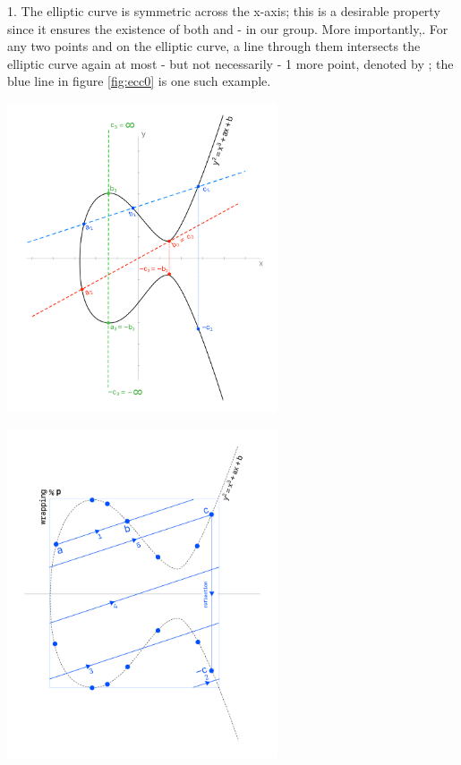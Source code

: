 \documentclass[a4paper,10pt]{article}
\begin{document}
\begin{flushleft}
{{	1. The elliptic curve is symmetric across the x-axis; this is a desirable property since it ensures the existence of both {} and -{} in our group. More importantly,. For any two points {} and {} on the elliptic curve, a line through them intersects the elliptic curve again at most - but not necessarily - 1 more point, denoted by {}; the blue line in figure \ref{fig:ecc0} is one such example.\linebreak\linebreak
	}}
\end{flushleft}
\begin{multicols}{2}
	\noindent
	\begin{minipage}{\linewidth}
		\centering
		\includegraphics[width=80mm]{ellipticCurve.png}
		\label{fig:ecc0}
	\end{minipage}
	\noindent
	\begin{minipage}{\linewidth}
		\centering
		\includegraphics[width=80mm]{ECC.png}

\end{minipage}
\end{multicols}
\end{document}
